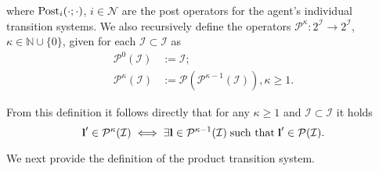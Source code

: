 \documentclass[reqno]{amsart}
\theoremstyle{plain}
\theoremstyle{definition}
\numberwithin{equation}{section}
\begin{document}
\noindent where ${\rm Post}_i(\cdot;\cdot)$, $i\in{\ensuremath{\mathcal{N}}}$ are the post operators for the agent's individual transition systems. We also recursively define the operators ${\ensuremath{\mathcal{P}}}^{\kappa}:2^{\ensuremath{\boldsymbol{\mathcal{I}}}}\to  2^{\ensuremath{\boldsymbol{\mathcal{I}}}}$, $\kappa\in\mathbb{N}\cup\{0\}$, given for each ${\ensuremath{\mathcal{I}}}\subset{\ensuremath{\boldsymbol{\mathcal{I}}}}$ as
\begin{align*}
{\ensuremath{\mathcal{P}}}^0({\ensuremath{\mathcal{I}}}) & :={\ensuremath{\mathcal{I}}}; \\
{\ensuremath{\mathcal{P}}}^{\kappa}({\ensuremath{\mathcal{I}}}) & :={\ensuremath{\mathcal{P}}}({\ensuremath{\mathcal{P}}}^{\kappa-1}({\ensuremath{\mathcal{I}}})),\kappa\ge 1. 
\end{align*}

\noindent From this definition it follows directly that for any $\kappa\ge 1$ and ${\ensuremath{\mathcal{I}}}\subset{\ensuremath{\boldsymbol{\mathcal{I}}}}$ it holds
\begin{equation} \label{post:operator:property}
{\textbf{{l}}}'\in {\ensuremath{\mathcal{P}}}^{\kappa}({\ensuremath{\mathcal{I}}}) \iff \exists {\textbf{{l}}}\in{\ensuremath{\mathcal{P}}}^{\kappa-1}({\ensuremath{\mathcal{I}}})\;\textup{such that}\; {\textbf{{l}}}'\in {\ensuremath{\mathcal{P}}}({\ensuremath{\mathcal{I}}}).
\end{equation} 

\noindent We next provide the definition of the product transition system.
\end{document}
